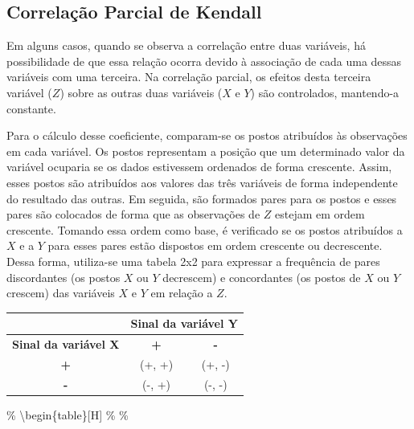 \documentclass[
]{estat/estat}
\begin{document}
\subsection{Correlação Parcial de
Kendall}\label{correlauxe7uxe3o-parcial-de-kendall}

Em alguns casos, quando se observa a correlação entre duas variáveis, há
possibilidade de que essa relação ocorra devido à associação de cada uma
dessas variáveis com uma terceira. Na correlação parcial, os efeitos
desta terceira variável (\(Z\)) sobre as outras duas variáveis (\(X\) e
\(Y\)) são controlados, mantendo-a constante.

Para o cálculo desse coeficiente, comparam-se os postos atribuídos às
observações em cada variável. Os postos representam a posição que um
determinado valor da variável ocuparia se os dados estivessem ordenados
de forma crescente. Assim, esses postos são atribuídos aos valores das
três variáveis de forma independente do resultado das outras. Em
seguida, são formados pares para os postos e esses pares são colocados
de forma que as observações de \(Z\) estejam em ordem crescente. Tomando
essa ordem como base, é verificado se os postos atribuídos a \(X\) e a
\(Y\) para esses pares estão dispostos em ordem crescente ou
decrescente. Dessa forma, utiliza-se uma tabela 2x2 para expressar a
frequência de pares discordantes (os postos \(X\) ou \(Y\) decrescem) e
concordantes (os postos de \(X\) ou \(Y\) crescem) das variáveis \(X\) e
\(Y\) em relação a \(Z\).

\begin{table}[H]
\centering
\begin{tabular}{c|cc}
\multicolumn{1}{l|}{}        & \multicolumn{2}{c}{\textbf{Sinal da variável Y}} \\ \midrule
\textbf{Sinal da variável X} & \textbf{+}              & \textbf{-}             \\ \midrule
\textbf{+}                   & (+, +)                  & (+, -)                 \\
\textbf{-}                   & (-, +)                  & (-, -)     
\end{tabular}
\end{table}

\% \textbackslash begin\{table\}{[}H{]} \% \centering \%
\end{document}
